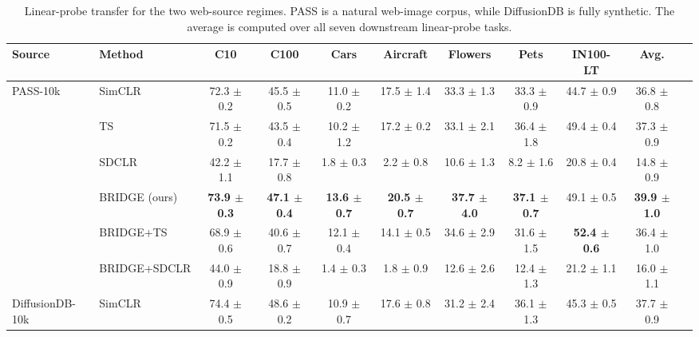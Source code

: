 \begin{table}[t]
\centering
\tiny
\setlength{\tabcolsep}{3.0pt}
\caption{Linear-probe transfer for the two web-source regimes. PASS is a natural web-image corpus, while DiffusionDB is fully synthetic. The average is computed over all seven downstream linear-probe tasks.}
\label{tab:main_sota_web_sources}
\begin{adjustbox}{max width=\textwidth}
\begin{tabular}{l l c c c c c c c c c}
\toprule
Source & Method & C10 & C100 & Cars & Aircraft & Flowers & Pets & IN100-LT & Avg. \\
\midrule
PASS-10k & SimCLR & 72.3 {\scriptsize$\pm$ 0.2} & 45.5 {\scriptsize$\pm$ 0.5} & 11.0 {\scriptsize$\pm$ 0.2} & 17.5 {\scriptsize$\pm$ 1.4} & 33.3 {\scriptsize$\pm$ 1.3} & 33.3 {\scriptsize$\pm$ 0.9} & 44.7 {\scriptsize$\pm$ 0.9} & 36.8 {\scriptsize$\pm$ 0.8} \\
 & TS & 71.5 {\scriptsize$\pm$ 0.2} & 43.5 {\scriptsize$\pm$ 0.4} & 10.2 {\scriptsize$\pm$ 1.2} & 17.2 {\scriptsize$\pm$ 0.2} & 33.1 {\scriptsize$\pm$ 2.1} & 36.4 {\scriptsize$\pm$ 1.8} & 49.4 {\scriptsize$\pm$ 0.4} & 37.3 {\scriptsize$\pm$ 0.9} \\
 & SDCLR & 42.2 {\scriptsize$\pm$ 1.1} & 17.7 {\scriptsize$\pm$ 0.8} & 1.8 {\scriptsize$\pm$ 0.3} & 2.2 {\scriptsize$\pm$ 0.8} & 10.6 {\scriptsize$\pm$ 1.3} & 8.2 {\scriptsize$\pm$ 1.6} & 20.8 {\scriptsize$\pm$ 0.4} & 14.8 {\scriptsize$\pm$ 0.9} \\
 & \rowcolor{blue!10} BRIDGE (ours) & \textbf{73.9 {\scriptsize$\pm$ 0.3}} & \textbf{47.1 {\scriptsize$\pm$ 0.4}} & \textbf{13.6 {\scriptsize$\pm$ 0.7}} & \textbf{20.5 {\scriptsize$\pm$ 0.7}} & \textbf{37.7 {\scriptsize$\pm$ 4.0}} & \textbf{37.1 {\scriptsize$\pm$ 0.7}} & 49.1 {\scriptsize$\pm$ 0.5} & \textbf{39.9 {\scriptsize$\pm$ 1.0}} \\
 & BRIDGE+TS & 68.9 {\scriptsize$\pm$ 0.6} & 40.6 {\scriptsize$\pm$ 0.7} & 12.1 {\scriptsize$\pm$ 0.4} & 14.1 {\scriptsize$\pm$ 0.5} & 34.6 {\scriptsize$\pm$ 2.9} & 31.6 {\scriptsize$\pm$ 1.5} & \textbf{52.4 {\scriptsize$\pm$ 0.6}} & 36.4 {\scriptsize$\pm$ 1.0} \\
 & BRIDGE+SDCLR & 44.0 {\scriptsize$\pm$ 0.9} & 18.8 {\scriptsize$\pm$ 0.9} & 1.4 {\scriptsize$\pm$ 0.3} & 1.8 {\scriptsize$\pm$ 0.9} & 12.6 {\scriptsize$\pm$ 2.6} & 12.4 {\scriptsize$\pm$ 1.3} & 21.2 {\scriptsize$\pm$ 1.1} & 16.0 {\scriptsize$\pm$ 1.1} \\
\midrule
DiffusionDB-10k & SimCLR & 74.4 {\scriptsize$\pm$ 0.5} & 48.6 {\scriptsize$\pm$ 0.2} & 10.9 {\scriptsize$\pm$ 0.7} & 17.6 {\scriptsize$\pm$ 0.8} & 31.2 {\scriptsize$\pm$ 2.4} & 36.1 {\scriptsize$\pm$ 1.3} & 45.3 {\scriptsize$\pm$ 0.5} & 37.7 {\scriptsize$\pm$ 0.9} \\

\end{tabular}
\end{adjustbox}
\end{table}
